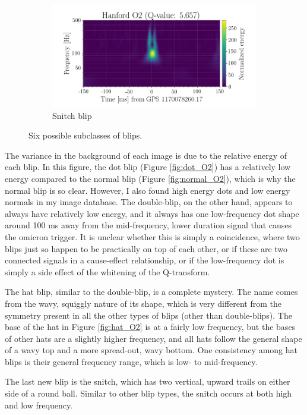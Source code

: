 \documentclass[a4paper]{article}
\begin{document}
\begin{figure}[h!]
\begin{subfigure}{.49\textwidth}
		\centering
		\includegraphics[width=1\linewidth]{snitch_O2}
		\caption{Snitch blip}
		\label{fig:snitch_O2}
	\end{subfigure}
	\caption{Six possible subclasses of blips.}
	\label{fig:six}
\end{figure}

The variance in the background of each image is due to the relative energy of each blip. In this figure, the dot blip (Figure \ref{fig:dot_O2}) has a relatively low energy compared to the normal blip (Figure \ref{fig:normal_O2}), which is why the normal blip is so clear. However, I also found high energy dots and low energy normals in my image database. The double-blip, on the other hand, appears to always have relatively low energy, and it always has one low-frequency dot shape around 100 ms away from the mid-frequency, lower duration signal that causes the omicron trigger. It is unclear whether this is simply a coincidence, where two blips just so happen to be practically on top of each other, or if these are two connected signals in a cause-effect relationship, or if the low-frequency dot is simply a side effect of the whitening of the Q-transform.

The hat blip, similar to the double-blip, is a complete mystery. The name comes from the wavy, squiggly nature of its shape, which is very different from the symmetry present in all the other types of blips (other than double-blips). The base of the hat in Figure \ref{fig:hat_O2} is at a fairly low frequency, but the bases of other hats are a slightly higher frequency, and all hats follow the general shape of a wavy top and a more spread-out, wavy bottom. One consistency among hat blips is their general frequency range, which is low- to mid-frequency.

The last new blip is the snitch, which has two vertical, upward trails on either side of a round ball. Similar to other blip types, the snitch occurs at both high and low frequency. 
\end{document}
